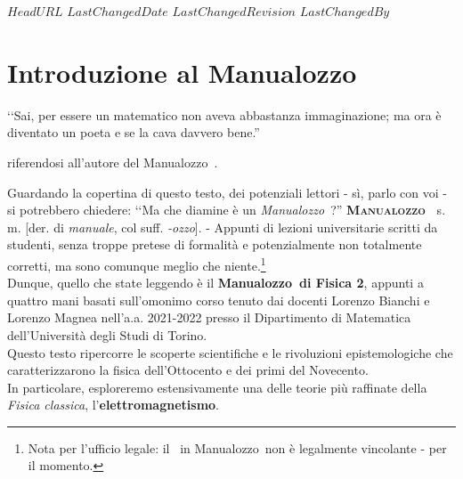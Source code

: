 \svnidlong
{$HeadURL$}
{$LastChangedDate$}
{$LastChangedRevision$}
{$LastChangedBy$}

\chapter*{Introduzione al Manualozzo\texttrademark\ }
\thispagestyle{empty}
\begin{introduction}
‘‘Sai, per essere un matematico non aveva abbastanza immaginazione; ma ora è diventato un poeta e se la cava davvero bene.''
\begin{flushright}
	 riferendosi  all'autore del Manualozzo\texttrademark\ .
\end{flushright}
\end{introduction}
\noindent Guardando la copertina di questo testo, dei potenziali lettori - sì, parlo con voi - si potrebbero chiedere: ‘‘Ma che diamine è un \textit{Manualozzo\texttrademark\ }?''
\vspace{3mm}
\lettrine[findent=1pt, nindent=0pt]{\textbf{M}}{\textbf{anualozzo\texttrademark\ }} s. m. [der. di \textit{manuale}, col suff. \textit{-ozzo}]. - Appunti di lezioni universitarie scritti da studenti, senza troppe pretese di formalità e potenzialmente non totalmente corretti, ma sono comunque meglio che niente.\footnote{Nota per l'ufficio legale: il \texttrademark\ in Manualozzo\texttrademark\ non è legalmente vincolante - per il momento.}
\vspace{3mm}\\
Dunque, quello che state leggendo è il \textbf{Manualozzo\texttrademark\  di Fisica 2}, appunti a quattro mani basati sull'omonimo corso tenuto dai docenti Lorenzo Bianchi e Lorenzo Magnea nell'a.a. 2021-2022 presso il Dipartimento di Matematica dell'Università degli Studi di Torino.\\
Questo testo ripercorre le scoperte scientifiche e le rivoluzioni epistemologiche che caratterizzarono la fisica dell'Ottocento e dei primi del Novecento.\\
In particolare, esploreremo estensivamente una delle teorie più raffinate della \textit{Fisica classica}, l'\textbf{elettromagnetismo}.
